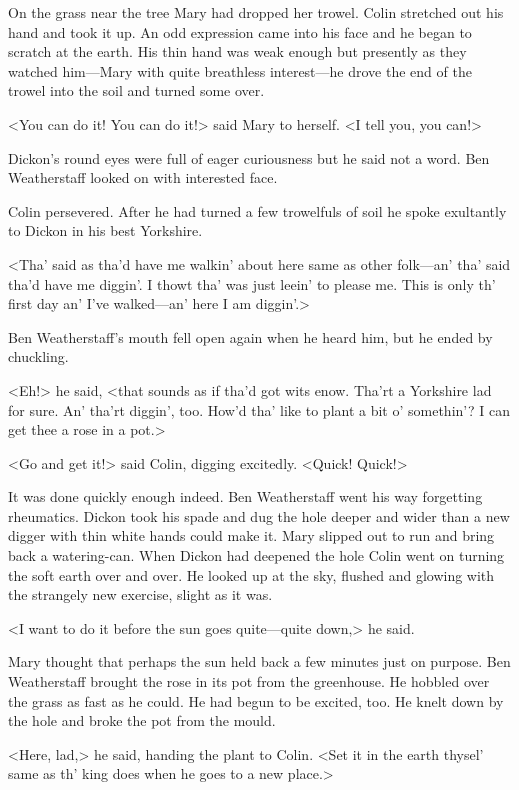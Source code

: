 On the grass near the tree Mary had dropped her trowel. Colin stretched out his hand and took it up. An odd expression came into his face and he began to scratch at the earth. His thin hand was weak enough but presently as they watched him—Mary with quite breathless interest—he drove the end of the trowel into the soil and turned some over.

<You can do it! You can do it!> said Mary to herself. <I tell you, you can!>

Dickon's round eyes were full of eager curiousness but he said not a word. Ben Weatherstaff looked on with interested face.

Colin persevered. After he had turned a few trowelfuls of soil he spoke exultantly to Dickon in his best Yorkshire.

<Tha' said as tha'd have me walkin' about here same as other folk—an' tha' said tha'd have me diggin'. I thowt tha' was just leein' to please me. This is only th' first day an' I've walked—an' here I am diggin'.>

Ben Weatherstaff's mouth fell open again when he heard him, but he ended by chuckling.

<Eh!> he said, <that sounds as if tha'd got wits enow. Tha'rt a Yorkshire lad for sure. An' tha'rt diggin', too. How'd tha' like to plant a bit o' somethin'? I can get thee a rose in a pot.>

<Go and get it!> said Colin, digging excitedly. <Quick! Quick!>

It was done quickly enough indeed. Ben Weatherstaff went his way forgetting rheumatics. Dickon took his spade and dug the hole deeper and wider than a new digger with thin white hands could make it. Mary slipped out to run and bring back a watering-can. When Dickon had deepened the hole Colin went on turning the soft earth over and over. He looked up at the sky, flushed and glowing with the strangely new exercise, slight as it was.

<I want to do it before the sun goes quite—quite down,> he said.

Mary thought that perhaps the sun held back a few minutes just on purpose. Ben Weatherstaff brought the rose in its pot from the greenhouse. He hobbled over the grass as fast as he could. He had begun to be excited, too. He knelt down by the hole and broke the pot from the mould.

<Here, lad,> he said, handing the plant to Colin. <Set it in the earth thysel' same as th' king does when he goes to a new place.>

